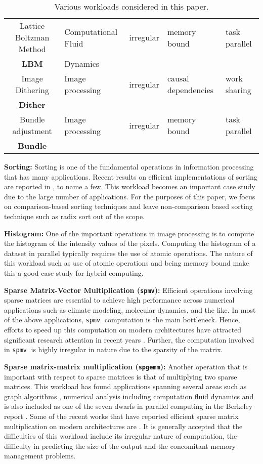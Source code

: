 \documentclass[11pt]{article}
\newcommand{\sgemm} {{\tt spgemm}}
\newcommand{\spmv} {{\tt spmv}}
\newcommand{\Bundle} {{\bf Bundle}}
\newcommand{\Dither} {{\bf Dither}}
\newcommand{\LBM} {{\bf LBM}}
\begin{document}
\begin{table*}[htp!]
\begin{center}
\begin{tabular}{|c||l|l|l|l|}
\hline
 Lattice Boltzman Method &  Computational Fluid & irregular
 & memory bound & task parallel \\
\LBM   & Dynamics & & & \\	 
\hline
 Image Dithering  &  Image processing & irregular & causal dependencies &work sharing   \\
\Dither & & & & \\
\hline
 Bundle adjustment  &   Image processing & irregular & memory bound & task parallel\\
\Bundle & & & & \\
\hline
\end{tabular}
\caption{Various workloads considered in this paper.}
\end{center}
\label{table:workloads}
\end{table*}

{\bf Sorting: } Sorting is one of the fundamental operations in information
processing that has many applications. Recent results
on efficient implementations of sorting are reported in
\cite{sanders10,owens11}, to name a few. This workload becomes an important
case study due to the large number of applications. 
For the purposes of
this paper, we focus on comparison-based sorting techniques and leave
non-comparison based sorting technique such as radix sort out of the
scope.

{\bf Histogram: } One of the important operations in image processing is to
compute the histogram of the intensity values of the pixels. Computing the histogram of a
dataset in parallel typically requires the use of atomic operations. The nature of this workload such as use of atomic
operations and being memory bound make this a good case study for hybrid
computing.


{\bf  Sparse Matrix-Vector Multiplication (\spmv): } Efficient operations
involving sparse matrices are essential
to achieve high performance across numerical applications such as climate 
modeling, molecular
dynamics, and the like.
In most of the above applications, \spmv$\;$ computation is the main
bottleneck. 
Hence, efforts to speed up this computation on modern architectures have attracted
significant research attention in recent years \cite{vuduc07,lanczos}.
Further, the computation involved in \spmv$\;$ is highly irregular in nature 
due to the sparsity of the matrix. 

{\bf Sparse matrix-matrix multiplication (\sgemm): } Another operation that is
important with respect to sparse matrices is that of multiplying two sparse
matrices. This workload has found applications spanning several areas such
as graph algorithms \cite{kunle11}, numerical analysis including computation
fluid dynamics \cite{cfd1,cfd2,lanczos} and is also included
as one of the seven dwarfs in parallel computing in the Berkeley report
\cite{landscape}. Some of the recent works that have reported efficient
sparse matrix multiplication on modern architectures are \cite{buluc}. It
is generally accepted that the difficulties of this workload include its
irregular nature of computation, the difficulty in predicting the size of
the output and the concomitant memory management problems.
\end{document}
